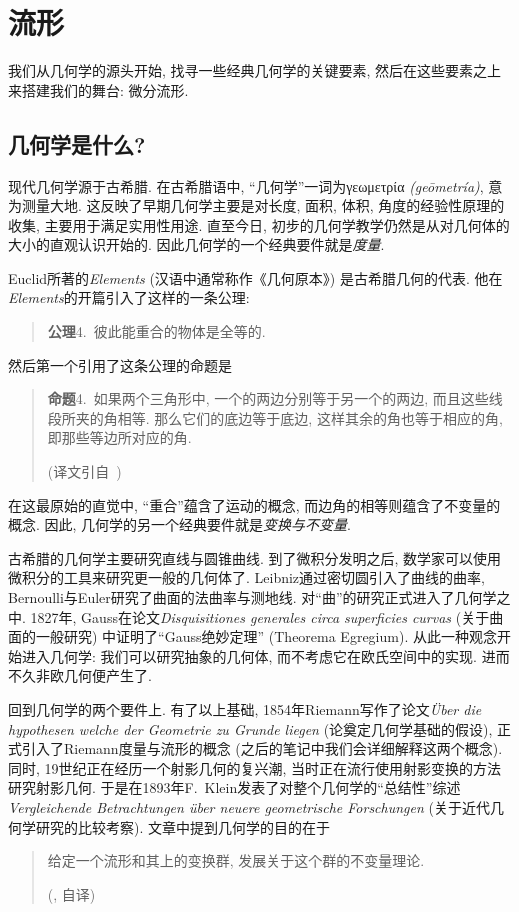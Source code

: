 \chapter{流形}\label{chapter_manifolds}
我们从几何学的源头开始, 找寻一些经典几何学的关键要素, 然后在这些要素之上来搭建我们的舞台: 微分流形.
\section{几何学是什么?}
现代几何学源于古希腊.
在古希腊语中, ``几何学''一词为γεωμετρία \textit{(geōmetría)}, 意为测量大地.
这反映了早期几何学主要是对长度, 面积, 体积, 角度的经验性原理的收集, 主要用于满足实用性用途.
直至今日, 初步的几何学教学仍然是从对几何体的大小的直观认识开始的.
因此几何学的一个经典要件就是\emph{度量}.\label{metric_first}

Euclid所著的\textit{Elements} (汉语中通常称作《几何原本》) 是古希腊几何的代表.
他在\textit{Elements}的开篇引入了这样的一条公理:
\begin{quotation}
    {\bfseries 公理}4.\ 彼此能重合的物体是全等的.
\end{quotation}
然后第一个引用了这条公理的命题是
\begin{quotation}
    {\bfseries 命题}4.\ 如果两个三角形中, 一个的两边分别等于另一个的两边, 而且这些线段所夹的角相等.
    那么它们的底边等于底边, 这样其余的角也等于相应的角, 即那些等边所对应的角.
    \begin{flushright}
        (译文引自~\parencite{Euclid_Elem})
    \end{flushright}
\end{quotation}
在这最原始的直觉中, ``重合''蕴含了运动的概念, 而边角的相等则蕴含了不变量的概念.
因此, 几何学的另一个经典要件就是\emph{变换与不变量}.

古希腊的几何学主要研究直线与圆锥曲线.
到了微积分发明之后, 数学家可以使用微积分的工具来研究更一般的几何体了.
Leibniz通过密切圆引入了曲线的曲率, Bernoulli与Euler研究了曲面的法曲率与测地线.
对``曲''的研究正式进入了几何学之中.
1827年, Gauss在论文\textit{Disquisitiones generales circa superficies curvas} (关于曲面的一般研究) 中证明了``Gauss绝妙定理'' (Theorema Egregium).
从此一种观念开始进入几何学: 我们可以研究抽象的几何体, 而不考虑它在欧氏空间中的实现.
进而不久非欧几何便产生了.

回到几何学的两个要件上.
有了以上基础, 1854年Riemann写作了论文\textit{\"{U}ber die hypothesen welche der Geometrie zu Grunde liegen} (论奠定几何学基础的假设), 正式引入了Riemann度量与流形的概念 (之后的笔记中我们会详细解释这两个概念).
同时, 19世纪正在经历一个射影几何的复兴潮, 当时正在流行使用射影变换的方法研究射影几何.
于是在1893年F.\ Klein发表了对整个几何学的``总结性''综述\textit{Vergleichende Betrachtungen \"{u}ber neuere geometrische Forschungen} (关于近代几何学研究的比较考察).
文章中提到几何学的目的在于
\begin{quotation}
    给定一个流形和其上的变换群, 发展关于这个群的不变量理论.
    \begin{flushright}
        (\parencite{Klein_Erlangen}, 自译)
    \end{flushright}
\end{quotation}

